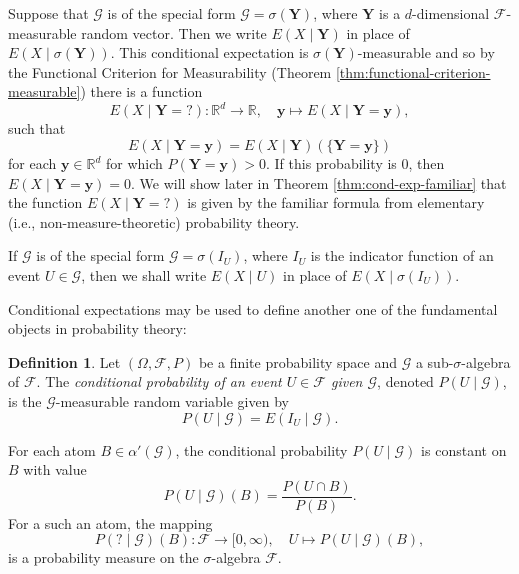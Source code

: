 \documentclass[reqno]{amsart}
\theoremstyle{definition}
\newtheorem{defn}[thm]{Definition}
\numberwithin{equation}{section}
\begin{document}
Suppose that $\mathcal{G}$ is of the special form $\mathcal{G} = \sigma(\mathbf{Y})$, where $\mathbf{Y}$ is a $d$-dimensional $\mathcal{F}$-measurable random vector. Then we write $E(X \mid \mathbf{Y})$ in place of $E(X\mid \sigma(\mathbf{Y}))$. This conditional expectation is $\sigma(\mathbf{Y})$-measurable and so by the Functional Criterion for Measurability (Theorem \ref{thm:functional-criterion-measurable}) there is a function
	\begin{equation}\label{eq:cond-exp-func}
	E(X \mid \mathbf{Y} = {?}) :\mathbb{R}^d \to \mathbb{R}, \quad \mathbf{y} \mapsto E(X \mid \mathbf{Y} = \mathbf{y}),
	\end{equation}
such that
	\[
	E(X \mid \mathbf{Y} = \mathbf{y}) = E(X \mid \mathbf{Y})(\{ \mathbf{Y} = \mathbf{y} \})
	\]
for each $\mathbf{y} \in \mathbb{R}^d$ for which $P(\mathbf{Y} = \mathbf{y})>0$. If this probability is $0$, then $E(X\mid \mathbf{Y}=\mathbf{y})=0$. We will show later in Theorem \ref{thm:cond-exp-familiar} that the function $E(X\mid \mathbf{Y} = {?})$ is given by the familiar formula from elementary (i.e., non-measure-theoretic) probability theory.

If $\mathcal{G}$ is of the special form $\mathcal{G} = \sigma(I_U)$, where $I_U$ is the indicator function of an event $U\in \mathcal{G}$, then we shall write $E(X \mid U)$ in place of $E(X \mid \sigma(I_U))$.

Conditional expectations may be used to define another one of the fundamental objects in probability theory:

\begin{defn}
Let $(\Omega, \mathcal{F}, P)$ be a finite probability space and $\mathcal{G}$ a sub-$\sigma$-algebra of $\mathcal{F}$. The \textit{conditional probability of an event $U\in \mathcal{F}$ given $\mathcal{G}$}, denoted $P(U \mid \mathcal{G})$, is the $\mathcal{G}$-measurable random variable given by
	\[
	P(U \mid \mathcal{G}) = E(I_U \mid \mathcal{G}).
	\]
\end{defn}

For each atom $B\in \alpha'(\mathcal{G})$, the conditional probability $P(U\mid \mathcal{G})$ is constant on $B$ with value
	\[
	P(U\mid \mathcal{G})(B) = \frac{P(U\cap B)}{P(B)}.
	\]
For a such an atom, the mapping
	\[
	P({?}\mid \mathcal{G})(B): \mathcal{F} \to [0, \infty), \quad U \mapsto P(U\mid \mathcal{G})(B),
	\]
is a probability measure on the $\sigma$-algebra $\mathcal{F}$.
\end{document}
